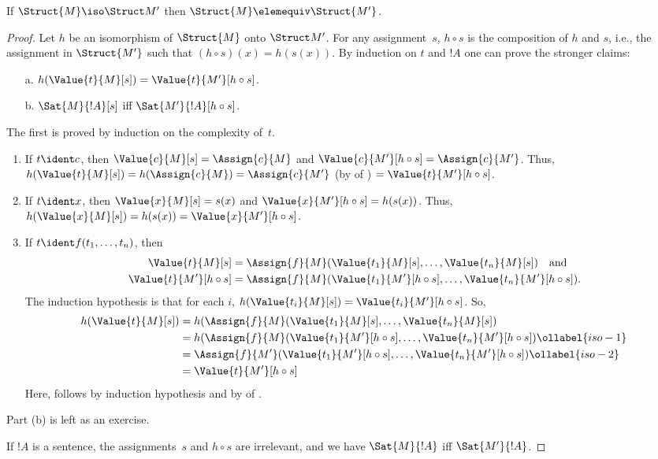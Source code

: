\documentclass[../../../include/open-logic-section]{subfiles}
\begin{document}
\begin{thm}
If $\Struct{M} \iso \Struct M'$ then $\Struct{M} \elemequiv
\Struct{M'}$.
\end{thm}

\begin{proof}
Let $h$ be an isomorphism of $\Struct{M}$ onto $\Struct M'$. For any
assignment~$s$, $h \circ s$ is the composition of $h$ and $s$, i.e.,
the assignment in $\Struct{M'}$ such that $(h \circ s)(x) = h(s(x))$.
By induction on $t$ and $!A$ one can prove the stronger claims:
\begin{enumerate}
  \item[a.] $h(\Value{t}{M}[s]) = \Value{t}{M'}[h\circ s]$.
  \item[b.] $\Sat{M}{!A}[s]$ iff $\Sat{M'}{!A}[h \circ s]$.
\end{enumerate}
The first is proved by induction on the complexity of~$t$.
\begin{enumerate}
\item If $t \ident c$, then $\Value{c}{M}[s] = \Assign{c}{M}$ and
  $\Value{c}{M'}[h \circ s] = \Assign{c}{M'}$. Thus,
  $h(\Value{t}{M}[s]) = h(\Assign{c}{M}) = \Assign{c}{M'}$ (by
   of ) $=
  \Value{t}{M'}[h \circ s]$.
\item If $t \ident x$, then $\Value{x}{M}[s] = s(x)$ and
  $\Value{x}{M'}[h \circ s] = h(s(x))$. Thus, $h(\Value{x}{M}[s]) =
  h(s(x)) = \Value{x}{M'}[h \circ s]$.
\item If $t \ident f(t_1, \dots, t_n)$, then
  \begin{align*}
    \Value{t}{M}[s] & = \Assign{f}{M}(\Value{t_1}{M}[s], \dots, \Value{t_n}{M}[s]) \quad\text{and}\\
  \Value{t}{M'}[h \circ s] & = \Assign{f}{M}(\Value{t_1}{M'}[h \circ
    s], \dots, \Value{t_n}{M'}[h \circ s]).
  \end{align*}
  The induction hypothesis is that for each $i$, $h(\Value{t_i}{M}[s])
  = \Value{t_i}{M'}[h\circ s]$. So,
  \begin{align}
    h(\Value{t}{M}[s]) 
    & = h(\Assign{f}{M}(\Value{t_1}{M}[s], \dots, \Value{t_n}{M}[s]) \notag\\
    & = h(\Assign{f}{M}(\Value{t_1}{M'}[h \circ s], \dots,
    \Value{t_n}{M'}[h \circ s]) \ollabel{iso-1}\\
    & = \Assign{f}{M'}(\Value{t_1}{M'}[h \circ s], \dots,
    \Value{t_n}{M'}[h \circ s]) \ollabel{iso-2}\\
    & = \Value{t}{M'}[h\circ s] \notag
  \end{align}
  Here,  follows by induction hypothesis and  by
   of .
\end{enumerate}
Part (b) is left as an exercise.

If $!A$ is a sentence, the assignments~$s$ and $h \circ s$ are
irrelevant, and we have $\Sat{M}{!A}$ iff $\Sat{M'}{!A}$.
\end{proof}
\end{document}
